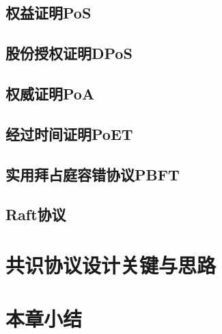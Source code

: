 \subsection{权益证明PoS}

\subsection{股份授权证明DPoS}

\subsection{权威证明PoA}

\subsection{经过时间证明PoET}

\subsection{实用拜占庭容错协议PBFT}

\subsection{Raft协议}

\section{共识协议设计关键与思路}

\section{本章小结}